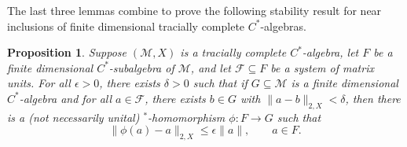\documentclass[a4paper,11pt]{amsart}
\newtheorem{proposition}[theorem]{Proposition}
\theoremstyle{definition}
\numberwithin{equation}{section}
\numberwithin{theorem}{section}
\newcommand{\M}{\mathcal{M}}
\begin{document}
The last three lemmas combine to prove the following stability result for near inclusions of finite dimensional tracially complete $C^*$-algebras.

\begin{proposition}
	\label{prop:near-inclusion}
	Suppose $(\M, X)$ is a tracially complete $C^*$-algebra, let $F$ be a finite dimensional $C^*$-subalgebra of $\M$, and let $\mathcal F \subseteq F$ be a system of matrix units.  For all $\epsilon > 0$, there exists $\delta > 0$ such that if $G \subseteq \M$ is a finite dimensional $C^*$-algebra and for all $a \in \mathcal F$, there exists $b \in G$ with $\|a - b\|_{2, X} < \delta$, then there is a (not necessarily unital) $^*$-homomorphism $\phi \colon F \rightarrow G$ such that 
	\begin{equation}
		\| \phi(a) - a \|_{2, X} \leq \epsilon \|a\|, \qquad  a \in F.
	\end{equation}
\end{proposition}
\end{document}
